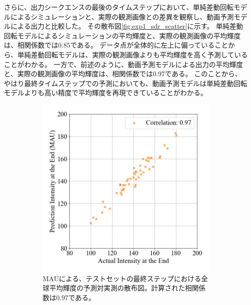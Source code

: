           さらに、出力シークエンスの最後のタイムステップにおいて、単純差動回転モデルによるシミュレーションと、実際の観測画像との差異を観察し、動画予測モデルによる出力と比較した。
          その散布図\ref{fig:exp1_sdr_scatter}に示す。
          単純差動回転モデルによるシミュレーションの平均輝度と、実際の観測画像の平均輝度は、相関係数では0.85である。
          データ点が全体的に左上に偏っていることから、単純差動回転モデルは、実際の観測画像よりも平均輝度を高く予測していることがわかる。
          一方で、前述のように、動画予測モデルによる出力の平均輝度と、実際の観測画像の平均輝度は、相関係数では0.97である。
          このことから、やはり最終タイムステップでの予測においても、動画予測モデルは単純差動回転モデルよりも高い精度で平均輝度を再現できていることがわかる。
          \begin{figure}[htbp]
            \begin{subfigure}[b]{0.5\textwidth}
              \centering
              \includegraphics[width=\textwidth]{figures/exp1/intensity_scatter_gt_pd.png}
              \caption{MAUによる、テストセットの最終ステップにおける全球平均輝度の予測対実測の散布図。計算された相関係数は0.97である。}
            \end{subfigure}
            \begin{subfigure}[b]{0.5\textwidth}
              \centering

\end{subfigure}
\end{figure}
